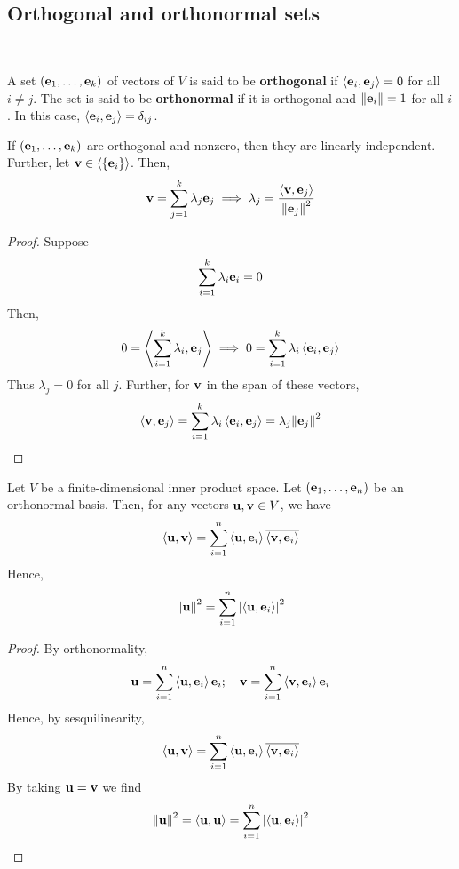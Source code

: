 \documentclass[a4paper]{article}
\begin{document}
\subsection{Orthogonal and orthonormal sets}
\ \vspace*{-1.5em}
\begin{definition}
	A set \( ({\bf e}_1, \dots, {\bf e}_k) \) of vectors of \( V \) is said to be \textbf{orthogonal} if \( \left\langle{{\bf e}_i, {\bf e}_j}\right\rangle = 0 \) for all \( i \neq j \).
	The set is said to be \textbf{orthonormal} if it is orthogonal and \( \norm{{\bf e}_i} = 1 \) for all \( i \).
	In this case, \( \left\langle{{\bf e}_i, {\bf e}_j}\right\rangle = \delta_{ij} \).
\end{definition}
\begin{lemma}
	If \( ({\bf e}_1, \dots, {\bf e}_k) \) are orthogonal and nonzero, then they are linearly independent.
	Further, let \( {\bf v} \in \left\langle{} \qty{{\bf e}_i} \right\rangle \).
	Then,
	\[
		{\bf v} = \sum_{j=1}^k \lambda_j {\bf e}_j \implies \lambda_j = \frac{\left\langle{{\bf v}, {\bf e}_j}\right\rangle}{\norm{{\bf e}_j}^2}
	\]
\end{lemma}
\begin{proof}
	Suppose
	\[
		\sum_{i=1}^k \lambda_i {\bf e}_i = 0
	\]
	Then,
	\[
		0 = \left\langle{\sum_{i=1}^k \lambda_i, {\bf e}_j}\right\rangle \implies 0 = \sum_{i=1}^k \lambda_i \left\langle{{\bf e}_i, {\bf e}_j}\right\rangle
	\]
	Thus \( \lambda_j = 0 \) for all \( j \).
	Further, for \( {\bf v} \) in the span of these vectors,
	\[
		\left\langle{{\bf v}, {\bf e}_j}\right\rangle = \sum_{i=1}^k \lambda_i \left\langle{{\bf e}_i, {\bf e}_j}\right\rangle = \lambda_j \norm{{\bf e}_j}^2 \qedhere
	\]
\end{proof}
\begin{corollary}
	Let \( V \) be a finite-dimensional inner product space.
	Let \( ({\bf e}_1, \dots, {\bf e}_n) \) be an orthonormal basis.
	Then, for any vectors \( {\bf u}, {\bf v} \in V \), we have
	\[
		\left\langle{{\bf u}, {\bf v}}\right\rangle = \sum_{i=1}^n \left\langle{{\bf u}, {\bf e}_i}\right\rangle \overline{\left\langle{{\bf v}, {\bf e}_i}\right\rangle}
	\]
	Hence,
	\[
		\norm{{\bf u}}^2 = \sum_{i=1}^n \abs{\left\langle{{\bf u},{\bf e}_i}\right\rangle}^2
	\]
\end{corollary}
\begin{proof}
	By orthonormality,
	\[
		{\bf u} = \sum_{i=1}^n \left\langle{{\bf u}, {\bf e}_i}\right\rangle {\bf e}_i;\quad {\bf v} = \sum_{i=1}^n \left\langle{{\bf v}, {\bf e}_i}\right\rangle {\bf e}_i
	\]
	Hence, by sesquilinearity,
	\[
		\left\langle{{\bf u},{\bf v}}\right\rangle = \sum_{i=1}^n \left\langle{{\bf u}, {\bf e}_i}\right\rangle \overline{\left\langle{{\bf v}, {\bf e}_i}\right\rangle}
	\]
	By taking \( {\bf u} = {\bf v} \) we find
	\[
		\norm{{\bf u}}^2 = \left\langle{{\bf u},{\bf u}}\right\rangle = \sum_{i=1}^n \abs{\left\langle{{\bf u},{\bf e}_i}\right\rangle}^2\qedhere
	\]
\end{proof}
\end{document}
